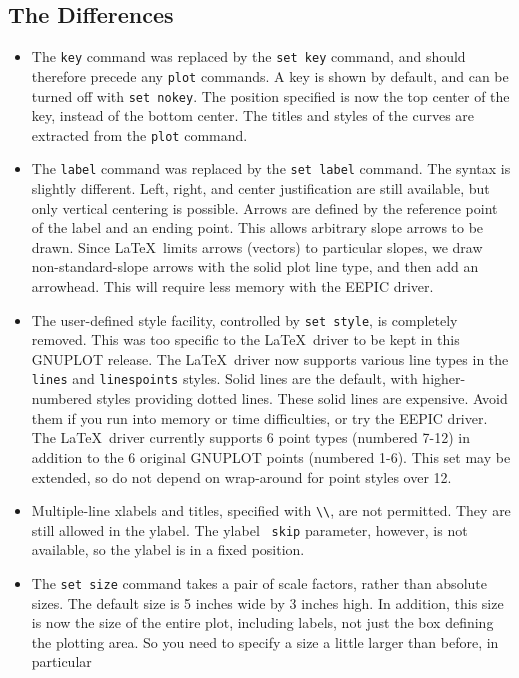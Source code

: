 \subsection{The Differences}
\begin{itemize}
\item The {\tt key} command was replaced by the {\tt set key}
command, and should therefore precede any {\tt plot} commands. A key
is shown by default, and can be turned off with {\tt set nokey}. The
position specified is now the top center of the key, instead of the
bottom center. The titles and styles of the curves are extracted from
the {\tt plot} command.
\item The {\tt label} command was replaced by the {\tt set label}
command. The syntax is slightly different. Left, right, and center
justification are still available, but only vertical centering is
possible. Arrows are defined by the reference point of the label and
an ending point. This allows arbitrary slope arrows to be drawn.
Since \LaTeX\ limits arrows (vectors) to particular slopes, we draw
non-standard-slope arrows with the solid plot line type, and then add
an arrowhead. This will require less memory with the EEPIC driver.
\item The user-defined style facility, controlled by {\tt set style},
is completely removed. This was too specific to the \LaTeX\ driver to
be kept in this GNUPLOT release. The \LaTeX\ driver now supports
various line types in the {\tt lines} and {\tt linespoints} styles.
Solid lines are the default, with higher-numbered styles providing
dotted lines. These solid lines are expensive. Avoid them if you run
into memory or time difficulties, or try the EEPIC driver. The
\LaTeX\ driver currently supports 6 point types (numbered 7-12) in
addition to the 6 original GNUPLOT points (numbered 1-6). This set may
be extended, so do not depend on wrap-around for point styles over 12. 
\item Multiple-line xlabels and titles, specified with \verb+\\+, are
not permitted. They are still allowed in the ylabel. The ylabel {\tt
skip} parameter, however, is not available, so the ylabel is in a
fixed position. 
\item The {\tt set size} command takes a pair of scale factors, rather
than absolute sizes. The default size is 5 inches wide by 3 inches
high. In addition, this size is now the size of the entire plot,
including labels, not just the box defining the plotting area. So you
need to specify a size a little larger than before, in particular

\end{itemize}
